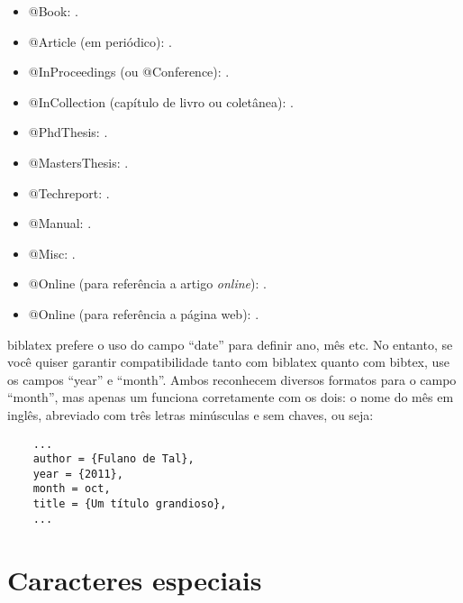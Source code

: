 \begin{multicols}{2}
  \begin{itemize}
    \item @Book: \cite{Knuth:96}.

    \item @Article (em periódico): \cite{floats2014}.

    \item @InProceedings (ou @Conference): \cite{alves03:simi}.

    \item @InCollection (capítulo de livro ou coletânea): \cite{bobaoglu93:concepts}.

    \item @PhdThesis: \cite{garcia01:PhD}.

    \item @MastersThesis: \cite{schmidt03:MSc}.

    \item @Techreport: \cite{alvisi99:analysisCIC}.

    \item @Manual: \cite{biblatex}.

    \item @Misc: \cite{gridftp}.

    \item @Online (para referência a artigo \emph{online}): \cite{fowler04:designDead}.

    \item @Online (para referência a página web): \cite{FSF:GNU-GPL}.
  \end{itemize}
\end{multicols}

\textsf{biblatex} prefere o uso do campo ``date'' para definir ano, mês
etc. No entanto, se você quiser garantir compatibilidade tanto com
\textsf{biblatex} quanto com \textsf{bibtex}, use os campos ``year'' e
``month''. Ambos reconhecem diversos formatos para o campo ``month'',
mas apenas um funciona corretamente com os dois: o nome do mês em inglês,
abreviado com três letras minúsculas e sem chaves, ou seja:

\begin{verbatim}
    ...
    author = {Fulano de Tal},
    year = {2011},
    month = oct,
    title = {Um título grandioso},
    ...
\end{verbatim}

\section{Caracteres especiais}

